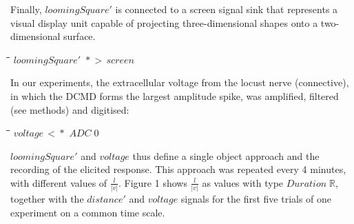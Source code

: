 \documentclass[11pt]{article}
\newlength{\lwidth}\setlength{\lwidth}{4.5cm}
\newlength{\cwidth}\setlength{\cwidth}{8mm} %
\newcommand{\Conid}[1]{\mathit{#1}}
\newcommand{\Varid}[1]{\mathit{#1}}
\begin{document}
Finally, \ensuremath{\Varid{loomingSquare'}} is connected to a screen signal sink that
represents a visual display unit capable of projecting
three-dimensional shapes onto a two-dimensional surface.
\begin{tabbing}
\qquad\=\hspace{\lwidth}\=\hspace{\cwidth}\=\+\kill
${\Varid{loomingSquare'}\,\,*\!\!\!>\,\Varid{screen}}$
\end{tabbing}In our experiments, the extracellular voltage from the locust nerve
(connective), in which the DCMD forms the largest amplitude spike,
was amplified, filtered (see methods) and digitised:
\begin{tabbing}
\qquad\=\hspace{\lwidth}\=\hspace{\cwidth}\=\+\kill
${\Varid{voltage}\,<\!\!\!*\,\,\Conid{ADC}\;\mathrm{0}}$
\end{tabbing}\ensuremath{\Varid{loomingSquare'}} and \ensuremath{\Varid{voltage}} thus define a single object approach
and the recording of the elicited response. This approach was repeated
every 4 minutes, with different values of $\frac{l}{|v|}$. Figure 1
shows $\frac{l}{|v|}$ as values with type \ensuremath{\Conid{Duration}\;\mathbb{R}}, together
with the \ensuremath{\Varid{distance'}} and \ensuremath{\Varid{voltage}} signals for the first five trials
of one experiment on a common time scale.
\end{document}
